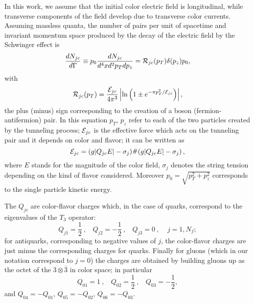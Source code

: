 \documentclass[aps,prc,a4paper,nofootinbib,
preprintnumbers,superscriptaddress,twocolumn,showpacs,showkeys]{revtex4}
\begin{document}
In this work, we assume that the initial color electric field is
longitudinal, while transverse components of the field develop due to transverse color currents.
Assuming massless quanta, the number of  pairs per unit of spacetime
and invariant momentum space produced by the decay of the electric field by the Schwinger effect 
is~\cite{Ryblewski:2013eja}
\begin{equation}
\frac{dN_{jc}}{d\Gamma}\equiv
p_0\frac{dN_{jc}}{d^4x d^2 p_T dp_z} = {\cal R}_{jc}(p_T)
\delta(p_z)p_0,
\label{eq:SF}
\end{equation}
with
\begin{equation}
{\cal R}_{jc}(p_T) =\frac{{\cal E}_{jc}}{4\pi^3}
\left|
\ln
\left(
1\pm e^{-\pi p_T^2/{\cal E}_{jc}}
\right)
\right|,
\label{eq:RpT}
\end{equation}
the plus (minus) sign corresponding to the creation of a boson (fermion-antifermion) pair.
In this equation $p_T$, $p_z$  refer to
each of the two particles created by the tunneling process;
${\cal E}_{jc}$ is the effective force which acts on the tunneling pair and it depends
on color and flavor; it can be written as
\begin{equation}
{\cal E}_{jc} = \left(
g|Q_{jc}E| - \sigma_{j}
\right)
\theta
\left(
g|Q_{jc}E| - \sigma_{j}
\right),
\label{eq:sigma}
\end{equation}
where $E$ stands for the magnitude of the color field,
$\sigma_j$ denotes the string tension depending on the kind of flavor considered.
Moreover $p_0=\sqrt{p_T^2 + p_z^2}$ corresponds to the single particle kinetic energy.


The $Q_{jc}$ are color-flavor charges which, in the case of quarks,
correspond to the eigenvalues of the $T_3$ operator:
\begin{equation}
Q_{j1}=\frac{1}{2}~,~~~~Q_{j2}=-\frac{1}{2}~,~~~~Q_{j3}=0~,~~~~~j=1,N_f;
\end{equation} 
for antiquarks, corresponding to negative values of $j$, the color-flavor charges
are just minus the corresponding charges for quarks. 
Finally for gluons (which 
in our notation correspond to $j=0$) the charges are obtained
by building gluons up as the octet of the $3\otimes \bar 3$
in color space; in particular \cite{Florkowski:2010zz,Ruggieri:2015yea}
\begin{equation}
Q_{01}=1~,~~~~Q_{02}=\frac{1}{2}~,~~~~Q_{03}=-\frac{1}{2},
\end{equation} 
and $Q_{04}=-Q_{01}$, $Q_{05}=-Q_{02}$, $Q_{06}=-Q_{03}$.
 
\end{document}
